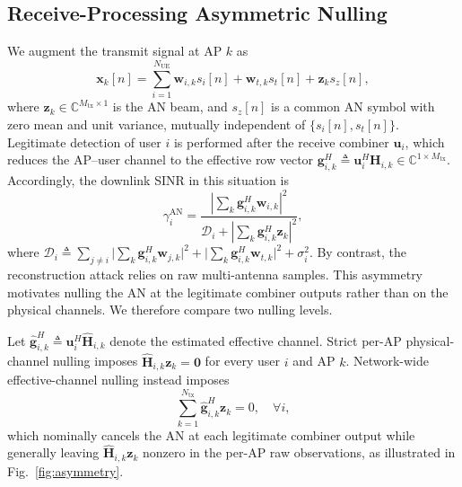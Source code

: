 \documentclass[letterpaper,journal]{IEEEtran}
\begin{document}
\subsection{Receive-Processing Asymmetric Nulling}
\label{subsec:asym}
\label{subsec:hierarchy}

We augment the transmit signal at AP $k$ as
\begin{equation}
\mathbf{x}_k[n]=\sum_{i=1}^{N_{\mathrm{UE}}}\mathbf{w}_{i,k}s_i[n]+\mathbf{w}_{t,k}s_t[n]+\mathbf{z}_ks_z[n],
\label{eq:xk-an}
\end{equation}
where $\mathbf{z}_k\in\mathbb{C}^{M_{\mathrm{tx}}\times 1}$ is the AN beam, and $s_z[n]$ is a common AN symbol with zero mean and unit variance, mutually independent of $\{s_i[n],s_t[n]\}$. Legitimate detection of user $i$ is performed after the receive combiner $\mathbf{u}_i$, which reduces the AP--user channel to the effective row vector $\mathbf{g}_{i,k}^H\triangleq\mathbf{u}_i^H\mathbf{H}_{i,k}\in\mathbb{C}^{1\times M_{\mathrm{tx}}}$. Accordingly, the downlink SINR in this situation is
\begin{equation}
\gamma_i^{\mathrm{AN}}=
\frac{\left|\sum_{k}\mathbf{g}_{i,k}^H\mathbf{w}_{i,k}\right|^2}{\mathcal{D}_i+\left|\sum_k\mathbf{g}_{i,k}^H\mathbf{z}_k\right|^2},
\label{eq:sinr-user-an}
\end{equation}
where $\mathcal{D}_i\triangleq{\textstyle\sum_{j\neq i}}\big|{\textstyle\sum_{k}}\mathbf{g}_{i,k}^H\mathbf{w}_{j,k}\big|^2+\big|{\textstyle\sum_{k}}\mathbf{g}_{i,k}^H\mathbf{w}_{t,k}\big|^2+\sigma_i^2$. By contrast, the reconstruction attack relies on raw multi-antenna samples. This asymmetry motivates nulling the AN at the legitimate combiner outputs rather than on the physical channels. We therefore compare two nulling levels.

Let $\widehat{\mathbf{g}}_{i,k}^H\triangleq\mathbf{u}_i^H\widehat{\mathbf{H}}_{i,k}$ denote the estimated effective channel. Strict per-AP physical-channel nulling imposes $\widehat{\mathbf{H}}_{i,k}\mathbf{z}_k=\mathbf{0}$ for every user $i$ and AP $k$. Network-wide effective-channel nulling instead imposes
\begin{equation}
\sum_{k=1}^{N_{\mathrm{tx}}}\widehat{\mathbf{g}}_{i,k}^H\mathbf{z}_k=0,\quad \forall i,
\label{eq:joint-null}
\end{equation}
which nominally cancels the AN at each legitimate combiner output while generally leaving $\widehat{\mathbf{H}}_{i,k}\mathbf{z}_k$ nonzero in the per-AP raw observations, as illustrated in Fig.~\ref{fig:asymmetry}.
\end{document}
